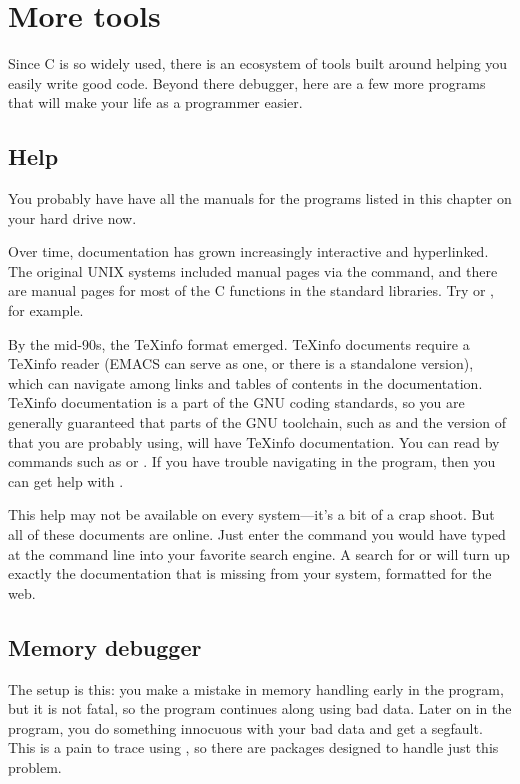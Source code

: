\section{More tools} 
Since C is so widely used, there is an ecosystem of tools built around
helping you easily write good code.  Beyond there debugger, here are a
few more programs that will make your life as a programmer easier.

\subsection{Help} 
You probably have have all the manuals for the programs listed in this
chapter on your hard drive now. 

Over time, documentation has grown increasingly interactive and
hyperlinked. The original UNIX systems included manual pages via the
 command, and there are manual pages for most of the C functions
in the standard libraries. Try  or ,
for example.

By the mid-90s, the \TeX info format emerged. \TeX info documents
require a \TeX info reader (EMACS can serve as one, or there is a
standalone version), which can navigate among links and tables of
contents in the documentation.
\TeX info documentation is a part of the GNU coding standards, so you
are generally guaranteed that parts of the GNU toolchain, such as
 and the version of  that you are probably using, will
have \TeX info documentation.
You can read by commands such as  or . If
you have trouble navigating in the  program, then you can
get help with .


This help may not be available on every system---it's a bit of
a crap shoot. But all of these documents are online. Just enter the
command you would have typed at the command line into your favorite
search engine. A search for  or  will
turn up exactly the documentation that is missing from your system,
formatted for the web.


\subsection{Memory debugger}  

The setup is this: you make a mistake in memory handling early in the
program, but it is not fatal, so the program continues along using bad
data. Later on in the program, you do something innocuous with your bad
data and get a segfault. This is a pain to trace using , so
there are packages designed to handle just this problem.

